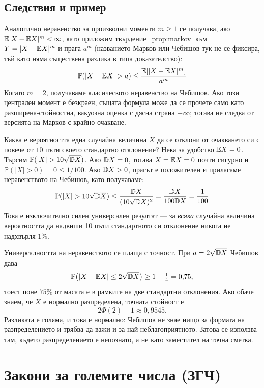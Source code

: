 \subsection{Следствия и пример}
Аналогично неравенство за произволни моменти $m \ge 1$ се получава, ако
$\mathbb{E}|X-\mathbb{E} X|^m<\infty$, като приложим твърдение~\ref{prop:markov} към
$Y = |X - \mathbb{E} X|^m$ и прага $a^m$ (названието Марков или Чебишов тук не се фиксира,
тъй като няма съществена разлика в типа доказателство):
\[
\mathbb{P}(|X - \mathbb{E} X| > a) \le \frac{\mathbb{E}[|X - \mathbb{E} X|^m]}{a^m}
\]
Когато $m=2$, получаваме класическото неравенство на Чебишов. Ако този централен момент
е безкраен, същата формула може да се прочете само като разширена-стойностна, вакуозна
оценка с дясна страна $+\infty$; тогава не следва от версията на Марков с крайно очакване.

\begin{example}\label{ex:10-1}
Каква е вероятността една случайна величина $X$ да се отклони от очакването си с повече от $10$ пъти своето стандартно отклонение?
Нека за удобство $\mathbb{E} X = 0$. Търсим $\mathbb{P}(|X| > 10\sqrt{\mathbb{D} X})$.
Ако $\mathbb{D} X=0$, тогава $X=\mathbb{E} X=0$ почти сигурно и
$\mathbb{P}(|X|>0)=0\le 1/100$. Ако $\mathbb{D} X>0$, прагът е положителен и прилагаме
неравенството на Чебишов, като получаваме:
\[
\mathbb{P}(|X| > 10\sqrt{\mathbb{D} X}) \le \frac{\mathbb{D} X}{(10\sqrt{\mathbb{D} X})^2} = \frac{\mathbb{D} X}{100 \mathbb{D} X} = \frac{1}{100}
\]
Това е изключително силен универсален резултат — за \emph{всяка} случайна величина вероятността да надвиши 10 пъти стандартното си отклонение никога не надхвърля $1\%$.

\end{example}

\begin{supp}\label{supp:cheb-vs-normal}
Универсалността на неравенството се плаща с точност. При $a = 2\sqrt{\mathbb{D} X}$ Чебишов дава
\[ \mathbb{P}\big(|X - \mathbb{E} X| \le 2\sqrt{\mathbb{D} X}\big) \ge 1 - \tfrac14 = 0{,}75 , \]
тоест поне $75\%$ от масата е в рамките на две стандартни отклонения. Ако обаче знаем, че
$X$ е нормално разпределена, точната стойност е
\[ 2\Phi(2) - 1 \approx 0{,}9545 . \]
Разликата е голяма, и това е нормално: Чебишов не знае нищо за формата на разпределението
и трябва да важи и за най-неблагоприятното. Затова се използва там, където разпределението
е непознато, а не като заместител на точна сметка.
\end{supp}

\section{Закони за големите числа (ЗГЧ)}

